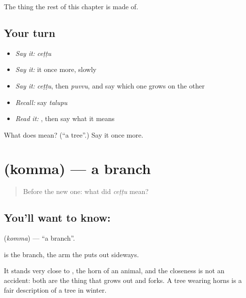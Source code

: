 \begin{grammarlens}[title={What you've built}]
The thing the rest of this chapter is made of.
\end{grammarlens}

\subsection*{Your turn}
\begin{itemize}
\raggedright
  \item \emph{Say it:} \emph{ceṭṭu}
  \item \emph{Say it:} it once more, slowly
  \item \emph{Say it:} \emph{ceṭṭu}, then \emph{puvvu}, and say which one grows on the other
  \item \emph{Recall:} say \emph{talupu}
  \item \emph{Read it:} \textbf{}, then say what it means
\end{itemize}

\begin{tcolorbox}[breakable,colback=teal!4,colframe=teal!35!black,title={Before you move on}]
What does  mean? (\textquotedblleft{}a tree\textquotedblright{}.) Say it once more.
\end{tcolorbox}
\section[\texorpdfstring{\te{కొమ్మ} (komma)}{కొమ్మ (komma)}]{ (komma) — a branch}

\label{lesson:TE-C54-branch}



\begin{quote}
Before the new one: what did \emph{ceṭṭu} mean?
\end{quote}

\subsection*{You'll want to know: }
\textbf{} (\emph{komma}) — \textquotedblleft{}a branch\textquotedblright{}.

 is the branch, the arm the  puts out sideways.

It stands very close to , the horn of an animal, and the closeness is not an accident: both are the thing that grows out and forks. A tree wearing horns is a fair description of a tree in winter.

